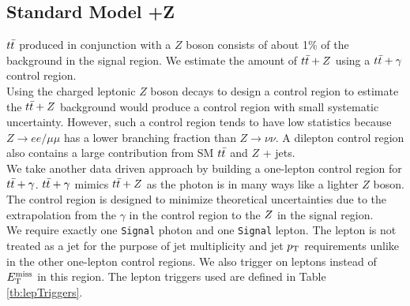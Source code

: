 \subsection{Standard Model \ttbar+Z}
\label{sec:Bkg:ttV}

\indent $t\bar{t}$ produced in conjunction with a $Z$ boson consists of about 1\% of the background in the signal region.  We estimate the amount of $t\bar{t}+Z$ using a $t\bar{t}+\gamma$ control region. \\

\indent Using the charged leptonic $Z$ boson decays to design a control region to estimate the $t\bar{t}+Z$ background would produce a control region with small systematic uncertainty. However, such a control region tends to have low statistics because $Z \rightarrow ee/\mu\mu$ has a lower branching fraction than $Z \rightarrow \nu\nu$.  A dilepton control region also contains a large contribution from SM $t\bar{t}$ and $Z$ + jets. \\

\indent We take another data driven approach by building a one-lepton control region for $t\bar{t}+\gamma$.  $t\bar{t}+\gamma$ mimics $t\bar{t}+Z$ as the photon is in many ways like a lighter $Z$ boson.  The control region is designed to minimize theoretical uncertainties due to the extrapolation from the $\gamma$ in the control region to the $Z$ in the signal region. \\

\indent We require exactly one {\tt Signal} photon and one {\tt Signal} lepton.  The lepton is not treated as a jet for the purpose of jet multiplicity and jet $p_{\mathrm{T}}$ requirements unlike in the other one-lepton control regions.  We also trigger on leptons instead of $E_{\mathrm{T}}^{\mathrm{miss}}$ in this region. The lepton triggers used are defined in Table \ref{tb:lepTriggers}.  \\

